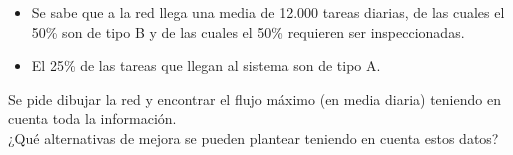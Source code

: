 \begin{itemize}
    \item Se sabe que a la red llega una media de 12.000 tareas diarias, de las cuales el 50\% son de tipo B y de las cuales el 50\% requieren ser inspeccionadas.
    \item El 25\% de las tareas que llegan al sistema son de tipo A.
\end{itemize}

Se  pide  dibujar  la  red  y  encontrar  el  flujo  máximo  (en  media  diaria)  teniendo  en  cuenta  toda  la información.\\
¿Qué alternativas de mejora se pueden plantear teniendo en cuenta estos datos?

\begin{tcolorbox}[colback=white,colframe=cyan!50!black,fonttitle=\bfseries]

\end{tcolorbox}